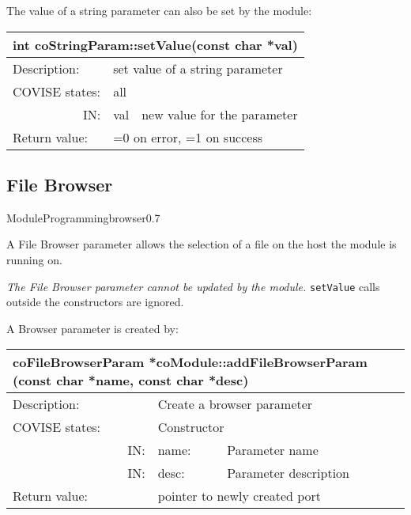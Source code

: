The value of a string parameter can also be set by the module:

\begin{longtable}{|p{4cm}|p{2.5cm}|p{7cm}|}
\hline
\multicolumn{3}{|p{13.5cm}|}{\bf int coStringParam::setValue(const char *val)} \\
\hline
{Description:}   
                        & \multicolumn{2}{|p{9.5cm}|}{set value of a string parameter} \\
\hline
{COVISE states:} & \multicolumn{2}{|p{9.5cm}|}{all} \\
\hline
\multicolumn{1}{|r|}{IN:} & {val} 
                            & {new value for the parameter}\\
\hline
{Return value:}  
                        & \multicolumn{2}{|p{9.5cm}|}{=0 on error, =1 on success} \endhead
\hline
\end{longtable}



\subsection{File Browser}


\begin{covimgpath}{ModuleProgramming}{browser}{0.7} \end{covimgpath}

A File Browser parameter allows the selection of a file on the host the module is running on. 

\emph{The File Browser parameter cannot be updated by the module.}
{\tt setValue} calls outside the constructors are ignored.

 

A Browser parameter is created by:


\begin{longtable}{|p{4cm}|p{2.5cm}|p{7cm}|}
\hline
\multicolumn{3}{|p{13.5cm}|}{\bf coFileBrowserParam *coModule::addFileBrowserParam 
(const char *name, const char *desc)} \\
\hline
{Description:}   
                        & \multicolumn{2}{|p{9.5cm}|}{Create a browser parameter} \\
\hline
{COVISE states:} & \multicolumn{2}{|p{9.5cm}|}{Constructor} \\
\hline
\multicolumn{1}{|r|}{IN:} & {name:} 
                             & {Parameter name}\\
\hline
\multicolumn{1}{|r|}{IN:} & {desc:} 
                            & {Parameter description}\\
\hline
{Return value:}  
                        & \multicolumn{2}{|p{9.5cm}|}{pointer to newly created port} \endhead
\hline
\end{longtable}

